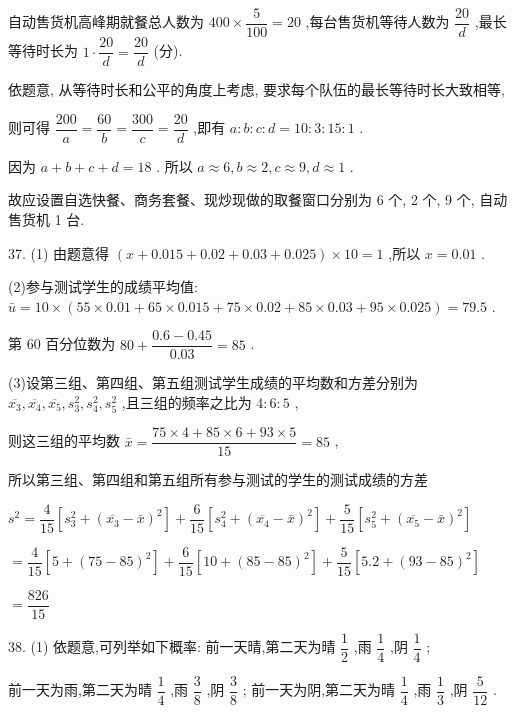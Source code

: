 自动售货机高峰期就餐总人数为 ${400} \times  \dfrac{5}{100} = {20}$ ,每台售货机等待人数为 $\dfrac{20}{d}$ ,最长等待时长为 $1 \cdot  \dfrac{20}{d} = \dfrac{20}{d}$ (分).

依题意, 从等待时长和公平的角度上考虑, 要求每个队伍的最长等待时长大致相等,

则可得 $\dfrac{200}{a} = \dfrac{60}{b} = \dfrac{300}{c} = \dfrac{20}{d}$ ,即有 $a : b : c : d = {10} : 3 : {15} : 1$ .

因为 $a + b + c + d = {18}$ . 所以 $a \approx  6,b \approx  2,c \approx  9,d \approx  1$ .

故应设置自选快餐、商务套餐、现炒现做的取餐窗口分别为 6 个, 2 个, 9 个, 自动售货机 1 台.

37. (1) 由题意得 $\left( {x + {0.015} + {0.02} + {0.03} + {0.025}}\right)  \times  {10} = 1$ ,所以 $x = {0.01}$ .

(2)参与测试学生的成绩平均值: $\bar{u} = {10} \times  \left( {{55} \times  {0.01} + {65} \times  {0.015} + {75} \times  {0.02} + {85} \times  {0.03} + {95} \times  {0.025}}\right)  = {79.5}$ .

第 60 百分位数为 ${80} + \dfrac{{0.6} - {0.45}}{0.03} = {85}$ .

(3)设第三组、第四组、第五组测试学生成绩的平均数和方差分别为 $\overline{{x}_{3}},\overline{{x}_{4}},\overline{{x}_{5}},{s}_{3}^{2},{s}_{4}^{2},{s}_{5}^{2}$ ,且三组的频率之比为 $4 : 6 : 5$ ,

则这三组的平均数 $\bar{x} = \dfrac{{75} \times  4 + {85} \times  6 + {93} \times  5}{15} = {85}$ ,

所以第三组、第四组和第五组所有参与测试的学生的测试成绩的方差

${s}^{2} = \dfrac{4}{15}\left\lbrack  {{s}_{3}^{2} + {\left( \overline{{x}_{3}} - \bar{x}\right) }^{2}}\right\rbrack   + \dfrac{6}{15}\left\lbrack  {{s}_{4}^{2} + {\left( \overline{{x}_{4}} - \bar{x}\right) }^{2}}\right\rbrack   + \dfrac{5}{15}\left\lbrack  {{s}_{5}^{2} + {\left( \overline{{x}_{5}} - \bar{x}\right) }^{2}}\right\rbrack$

$= \dfrac{4}{15}\left\lbrack  {5 + {\left( {75} - {85}\right) }^{2}}\right\rbrack   + \dfrac{6}{15}\left\lbrack  {{10} + {\left( {85} - {85}\right) }^{2}}\right\rbrack   + \dfrac{5}{15}\left\lbrack  {{5.2} + {\left( {93} - {85}\right) }^{2}}\right\rbrack$

$= \dfrac{826}{15}$

38. (1) 依题意,可列举如下概率: 前一天晴,第二天为晴 $\dfrac{1}{2}$ ,雨 $\dfrac{1}{4}$ ,阴 $\dfrac{1}{4}$ ;

前一天为雨,第二天为晴 $\dfrac{1}{4}$ ,雨 $\dfrac{3}{8}$ ,阴 $\dfrac{3}{8}$ ; 前一天为阴,第二天为晴 $\dfrac{1}{4}$ ,雨 $\dfrac{1}{3}$ ,阴 $\dfrac{5}{12}$ .

